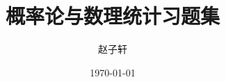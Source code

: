 \documentclass[11pt, fontset=windows]{MyBeautybook-CN}
\begin{document}
    \title{\Huge{\textbf{概率论与数理统计习题集}}} %
    \author{赵子轩} %
    \date{\today} %
    \linespread{1.5}
    \maketitle
    \thispagestyle{empty}

    \frontmatter
    \tableofcontents
    \newpage
    \thispagestyle{empty}

    \mainmatter

    
    
    
    
\end{document}
